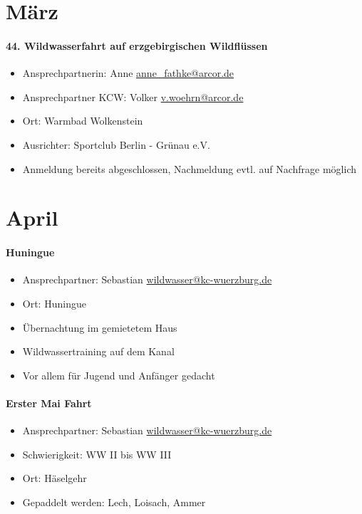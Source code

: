 \documentclass[12pt, a4paper]{report}
\begin{document}
\section*{März}\paragraph{44. Wildwasserfahrt auf erzgebirgischen Wildflüssen}
\begin{itemize}
    \item Ansprechpartnerin: Anne \href{mailto:anne\_fathke@arcor.de}{anne\_fathke@arcor.de}
    \item Ansprechpartner KCW: Volker \href{mailto:v.woehrn@arcor.de}{v.woehrn@arcor.de}
    \item Ort:  Warmbad Wolkenstein
    \item Ausrichter: Sportclub Berlin - Grünau e.V.
    \item Anmeldung bereits abgeschlossen, Nachmeldung evtl. auf Nachfrage möglich
\end{itemize}

\section*{April}\paragraph{Huningue}
\begin{itemize}
    \item Ansprechpartner: Sebastian \href{mailto:wildwasser@kc-wuerzburg.de}{wildwasser@kc-wuerzburg.de}
    \item Ort: Huningue
    \item Übernachtung im gemietetem Haus
    \item Wildwassertraining auf dem Kanal
    \item Vor allem für Jugend und Anfänger gedacht
\end{itemize}

\paragraph{Erster Mai Fahrt}
\begin{itemize}
    \item Ansprechpartner: Sebastian \href{mailto:wildwasser@kc-wuerzburg.de}{wildwasser@kc-wuerzburg.de}
    \item Schwierigkeit: WW II bis WW III
    \item Ort: Häselgehr
    \item Gepaddelt werden: Lech, Loisach, Ammer
\end{itemize}
\end{document}

